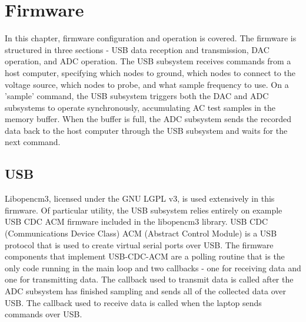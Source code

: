 \documentclass[11pt,twoside]{mitthesis}
\begin{document}
\fi

\chapter{Firmware}

In this chapter, firmware configuration and operation is covered.
The firmware is structured in three sections - USB data reception and transmission, DAC operation, and ADC operation.
The USB subsystem receives commands from a host computer, specifying which nodes to ground, which nodes to connect to the voltage source, which nodes to probe, and what sample frequency to use.
On a 'sample' command, the USB subsystem triggers both the DAC and ADC subsystems to operate synchronously, accumulating AC test samples in the memory buffer.
When the buffer is full, the ADC subsystem sends the recorded data back to the host computer through the USB subsystem and waits for the next command.

\section{USB}

Libopencm3, licensed under the GNU LGPL v3, is used extensively in this firmware.
Of particular utility, the USB subsystem relies entirely on example USB CDC ACM firmware included in the libopencm3 library.
USB CDC (Communications Device Class) ACM (Abstract Control Module) is a USB protocol that is used to create virtual serial ports over USB.
The firmware components that implement USB-CDC-ACM are a polling routine that is the only code running in the main loop and two callbacks - one for receiving data and one for transmitting data.
The callback used to transmit data is called after the ADC subsystem has finished sampling and sends all of the collected data over USB.
The callback used to receive data is called when the laptop sends commands over USB.
\end{document}
